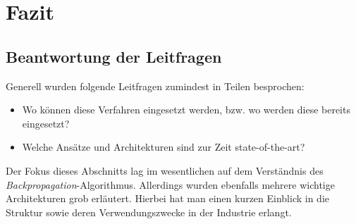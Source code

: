 \section{Fazit}


\subsection{Beantwortung der Leitfragen}

Generell wurden folgende Leitfragen zumindest in Teilen besprochen: 

\begin{itemize}
\item Wo können diese Verfahren eingesetzt werden, bzw. wo werden diese bereits eingesetzt?
\item Welche Ansätze und Architekturen sind zur Zeit state-of-the-art?
\end{itemize}

Der Fokus dieses Abschnitts lag im wesentlichen auf dem Verständnis des \emph{Backpropagation}-Algorithmus. Allerdings wurden ebenfalls mehrere wichtige Architekturen grob erläutert. Hierbei hat man einen kurzen Einblick in die Struktur sowie deren Verwendungszwecke in der Industrie erlangt. 
